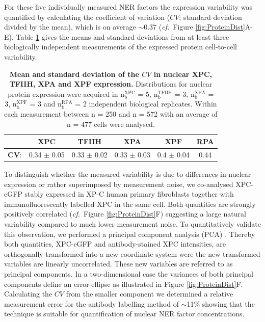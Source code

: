 \clearpage
For these five individually measured NER factors the expression variability was quantified by calculating the coefficient of variation ($CV$; standard deviation divided by the mean), which is on average $\sim$0.37 (\textit{cf.}\ Figure \ref{fig:ProteinDist}A-E). Table \ref{tab:proteinVariability} gives the means and standard deviations from at least three biologically independent measurements of the expressed protein cell-to-cell variability.




\begin{table}[t!]
	\centering
	\begin{tabular}{cccccc}
		\hline
		\rule{0pt}{2ex}
		&\textbf{XPC} & \textbf{TFIIH} & \textbf{XPA} & \textbf{XPF} & \textbf{RPA}\\ \hline
		\rule{0pt}{3ex}
		$\mathbf{CV}$: & 0.34 $\pm$ 0.05 & 0.33 $\pm$ 0.02 & 0.33 $\pm$ 0.03 & 0.4 $\pm$ 0.04 & 0.44\\ \hline
		
	\end{tabular}
	\caption{\textbf{Mean and standard deviation of the $CV$ in nuclear XPC, TFIIH, XPA and XPF expression.} Distributions for nuclear protein expression were acquired in $\text{n}_{\text{b}}^{\text{XPC}}$ = 5, $\text{n}_{\text{b}}^{\text{TFIIH}}$ = 3, $\text{n}_{\text{b}}^{\text{XPA}}$ = 3, $\text{n}_{\text{b}}^{\text{XPF}}$ = 3 and $\text{n}_{\text{b}}^{\text{RPA}}$ = 2 independent biological replicates. Within each measurement between n = 250 and n = 572 with an average of n = 477 cells were analysed.}\label{tab:proteinVariability}
\end{table}      

To distinguish whether the measured variability is due to differences in nuclear expression or rather superimposed by measurement noise, we co-analysed XPC-eGFP stably expressed in XP-C human primary fibroblasts together with immunofluorescently labelled XPC in the same cell. Both quantities are strongly positively correlated (\textit{cf.}\ Figure \ref{fig:ProteinDist}F) suggesting a large natural variability compared to much lower measurement noise. To quantitatively validate this observation, we performed a principal component analysis (PCA) \label{sec:pca} \cite{Pearson1901}. Thereby both quantities, XPC-eGFP and antibody-stained XPC intensities, are orthogonally transformed into a new coordinate system were the new transformed variables are linearly uncorrelated. These new variables are referred to as principal components. In a two-dimensional case the variances of both principal components define an error-ellipse as illustrated in Figure \ref{fig:ProteinDist}F. Calculating the $CV$ from the smaller component we determined a relative measurement error for the antibody labelling method of $\sim$11\% showing that the technique is suitable for quantification of nuclear NER factor concentrations.
      


